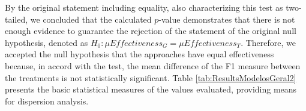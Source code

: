 By the original statement including equality, also characterizing this test as two-tailed, we concluded that the calculated $p$-value demonstrates that there is not enough evidence to guarantee the rejection of the statement of the original null hypothesis, denoted as $H_0 : \mu Effectiveness_G = \mu Effectiveness_T$.
Therefore, we accepted the null hypothesis that the approaches have equal effectiveness because, in accord with the test, the mean difference of the F1 measure between the treatments is not statistically significant.
Table \ref{tab:ResultsModelosGeral2} presents the basic statistical measures of the values evaluated, providing means for dispersion analysis.

